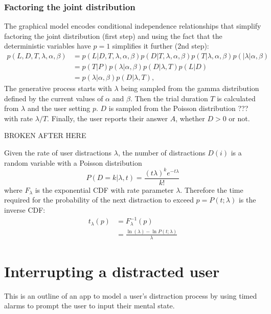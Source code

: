\documentclass{article}
\begin{document}
\subsubsection{Factoring the joint distribution}
The graphical model encodes conditional independence relationships that simplify factoring the joint distribution (first step) and using the fact that the deterministic variables have $p=1$ simplifies it further (2nd step):
\begin{align}
p(L, D, T, \lambda, \alpha, \beta) &= p(L| D, T, \lambda, \alpha, \beta)p(D| T, \lambda, \alpha, \beta)p(T| \lambda, \alpha, \beta)p(| \lambda| \alpha, \beta) \nonumber\\
&= p(T|P)p(\lambda|\alpha, \beta)p(D|\lambda, T)p(L|D)\nonumber\\
&=p(\lambda|\alpha, \beta)p(D|\lambda, T)\label{joint},
\end{align}
The generative process starts with $\lambda$ being sampled from the gamma distribution defined by the current values of $\alpha$ and $\beta$. Then the trial duration $T$ is calculated from $\lambda$ and the user setting $p$. $D$ is sampled from the Poisson distribution ??? with rate $\lambda/T$. Finally, the user reports their answer $A$, whether $D>0$ or not.



BROKEN AFTER HERE



Given the rate of user distractions $\lambda$, the number of distractions $D(i)$ is a random variable with a Poisson distribution
\begin{equation}
  P(D=k|\lambda,t) = \frac{ (t\lambda)^k e^{-t\lambda}}{k!}%
\end{equation}
where $F_\lambda$ is the exponential CDF with rate parameter $\lambda$.  Therefore the time required for the probability of the next distraction to exceed $p=P(t;\lambda)$ is the inverse CDF:
\begin{align}
  t_\lambda(p)& = F_\lambda^{-1}(p)\nonumber\\
  & = \frac{\ln(\lambda) -\ln P(t;\lambda) }{\lambda}\label{inv_dist}
\end{align}


\section{Interrupting a distracted user}
This is an outline of an app to model a user's distraction process by using timed alarms to prompt the user to input their mental state.
\end{document}
